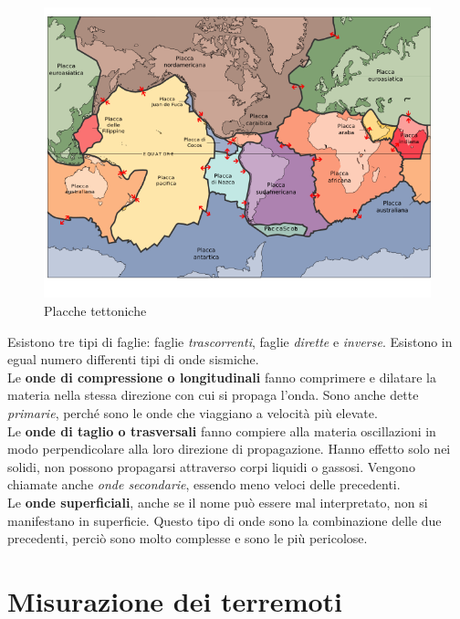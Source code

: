 \documentclass[a4paper,10pt]{memoir}
\begin{document}
\begin{figure}
\caption{Placche tettoniche}
\label{fig:placchetettoniche}
\includegraphics[width=1\textwidth]{Chapter-1/placche-tettoniche.png}
\end{figure}
Esistono tre tipi di faglie: faglie \textit{trascorrenti}, faglie \textit{dirette} e \textit{inverse}.
Esistono in egual numero differenti tipi di onde sismiche.
\\
Le \textbf{onde di compressione o longitudinali} fanno comprimere e dilatare la materia nella stessa direzione con cui si propaga l'onda.
Sono anche dette \textit{primarie}, perché sono le onde che viaggiano a velocità più elevate.
\\
Le \textbf{onde di taglio o trasversali} fanno compiere alla materia oscillazioni in modo perpendicolare alla loro direzione di propagazione. Hanno effetto solo nei solidi, non possono propagarsi attraverso corpi liquidi o gassosi.
Vengono chiamate anche \textit{onde secondarie}, essendo meno veloci delle precedenti.
\\
Le \textbf{onde superficiali}, anche se il nome può essere mal interpretato, non si manifestano in superficie. Questo tipo di onde sono la combinazione delle due precedenti, perciò sono molto complesse e sono le più pericolose. 

\clearpage

\section{Misurazione dei terremoti}
\end{document}
